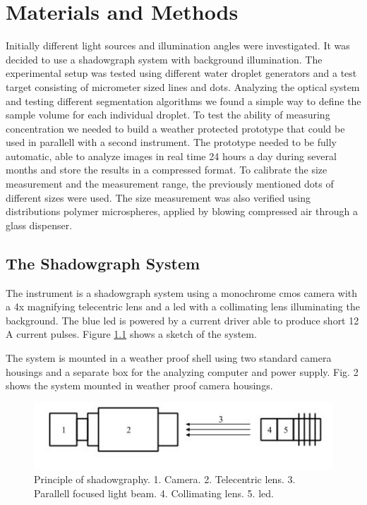 
\chapter{Materials and Methods}
\label{chap:methods}

Initially different light sources and illumination angles were investigated. It was decided to use a shadowgraph system with background illumination. The experimental setup was tested using different water droplet generators and a test target consisting of micrometer sized lines and dots. Analyzing the optical system and testing different segmentation algorithms we found a simple way to define the sample volume for each individual droplet. To test the ability of measuring concentration we needed to build a weather protected prototype that could be used in parallell with a second instrument. The prototype needed to be fully automatic, able to analyze images in real time 24 hours a day during several months and store the results in a compressed format. To calibrate the size measurement and the measurement range, the previously mentioned dots of different sizes were used. The size measurement was also verified using distributions polymer microspheres, applied by blowing compressed air through a glass dispenser.


\section{The Shadowgraph System}

The instrument is a shadowgraph system using a monochrome \gls{cmos} camera with a 4x magnifying telecentric lens and a \gls{led} with a collimating lens illuminating the background. The blue \gls{led} is powered by a current driver able to produce short 12 A current pulses. Figure \cref{fig:shadowprinc} shows a sketch of the system. 

The system is mounted in a weather proof shell using two standard camera housings and a separate box for the analyzing computer and power supply. Fig. 2 shows the system mounted in weather proof camera housings. 

\begin{figure}[ht]
\centering\includegraphics[width=0.75\linewidth]{./figures/shadowprinc.jpg}
\caption{Principle of shadowgraphy. 1. Camera. 2. Telecentric lens. 3. Parallell focused light beam. 4. Collimating lens. 5. \gls{led}.}
\label{fig:shadowprinc}
\end{figure}

